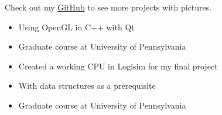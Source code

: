 \documentclass[10pt,a4paper,ragged2e]{altacv}
\begin{document}
\begin{paracol}{2}
	\medskip

	Check out my \href{https://github.com/akriegman}{GitHub} to see more projects with pictures.

	\medskip


	\begin{itemize}
		\item Using OpenGL in C++ with Qt
		\item Graduate course at University of Pennsylvania
	\end{itemize}

	\begin{itemize}
		\item Created a working CPU in Logisim for my final project
	\end{itemize}




	\begin{itemize}
		\item With data structures as a prerequisite
	\end{itemize}

	\begin{itemize}
		\item Graduate course at University of Pennsylvania
	\end{itemize}






\end{paracol}
\end{document}
